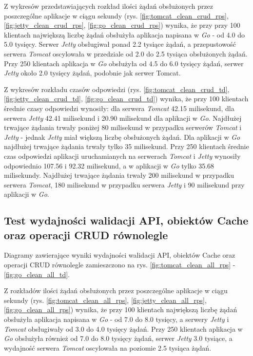 Z wykresów przedstawiających rozkład ilości żądań obsłużonych przez poszczególne aplikacje w ciągu sekundy (rys. \ref{fig:tomcat_clean_crud_rps}, \ref{fig:jetty_clean_crud_rps}, \ref{fig:go_clean_crud_rps}) wynika, że przy przy 100 klientach największą liczbę żądań obsłużyła aplikacja napisana w \textsl{Go} - od 4.0 do 5.0 tysięcy. Serwer \textsl{Jetty} obsługiwał ponad 2.2 tysiące żądań, a przepustowość serwera \textsl{Tomcat} oscylowała w przedziale od 2.0 do 2.5 tysiąca obsłużonych żądań. Przy 250 klientach aplikacja w \textsl{Go} obsłużyła od 4.5 do 6.0 tysięcy żądań, serwer \textsl{Jetty} około 2.0 tysięcy żądań, podobnie jak serwer Tomcat.

Z wykresów rozkładu czasów odpowiedzi (rys. \ref{fig:tomcat_clean_crud_td}, \ref{fig:jetty_clean_crud_td}, \ref{fig:go_clean_crud_td}) wynika, że przy 100 klientach średnie czasy odpowiedzi wynosiły: dla serwera \textsl{Tomcat} 42.15  milisekund, dla serwera \textsl{Jetty} 42.41  milisekund i 20.90 milisekund dla aplikacji w \textsl{Go}.  Najdłużej trwające żądania trwały poniżej 80 milisekund w przypadku serwerów \textsl{Tomcat} i \textsl{Jetty} - jednak \textsl{Jetty} miał większą liczbę obsłużonych żądań. Dla aplikacji w \textsl{Go} najdłużej trwające żądania trwały tylko 35 milisekund. Przy 250 klientach średnie czas odpowiedzi aplikacji uruchamianych na serwerach \textsl{Tomcat} i \textsl{Jetty}  wynosiły  odpowiednio 107.56 i 92.32 milisekund, a w aplikacji w \textsl{Go} tylko 35.68 milisekundy. Najdłużej trwające żądania trwały 200 milisekund w przypadku serwera \textsl{Tomcat}, 180 milisekund w przypadku serwera \textsl{Jetty} i 90 milisekund przy aplikacji w \textsl{Go}.

% 
\clearpage

\subsection{Test wydajności walidacji API, obiektów Cache oraz operacji CRUD równolegle}
Diagramy zawierające wyniki wydajności walidacji API, obiektów Cache oraz operacji CRUD równolegle zamieszczono na rys. \ref{fig:tomcat_clean_all_rps} - \ref{fig:go_clean_all_td}.                                                                  

Z rozkładów ilości żądań obsłużonych przez poszczególne aplikacje w ciągu sekundy (rys. \ref{fig:tomcat_clean_all_rps}, \ref{fig:jetty_clean_all_rps}, \ref{fig:go_clean_all_rps}) wynika, że przy 100 klientach największą liczbę żądań obsłużyła aplikacja napisana w \textsl{Go} - od 7.0 do 8.0 tysięcy, a serwery \textsl{Jetty} i \textsl{Tomcat} obsługiwały od 3.0 do 4.0  tysięcy żądań. Przy 250 klientach aplikacja w \textsl{Go} obsłużyła również od 7.0 do 8.0 tysięcy żądań, serwer \textsl{Jetty} 3.0 tysiące, a wydajność serwera \textsl{Tomcat} oscylowała na poziomie 2.5 tysiąca żądań. 
 
